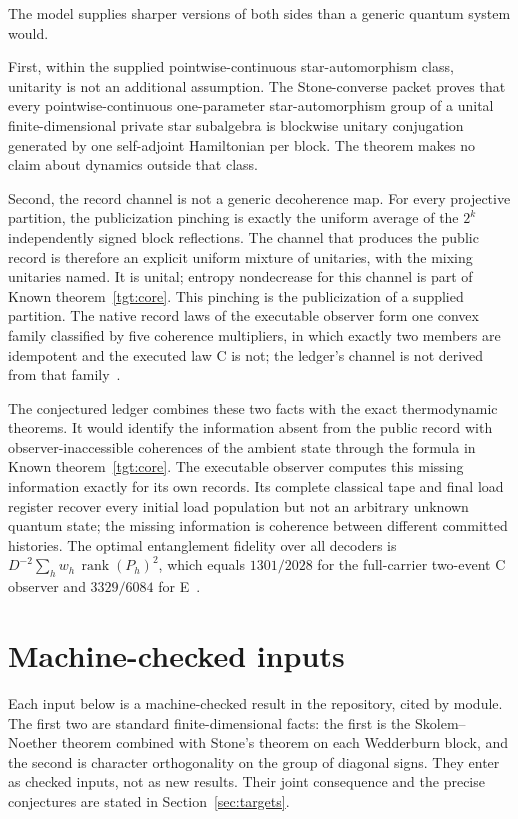 \documentclass[11pt]{article}
\theoremstyle{remark}
\begin{document}
The model supplies sharper versions of both sides than a generic quantum
system would.

First, within the supplied pointwise-continuous star-automorphism class,
unitarity is not an additional assumption. The Stone-converse packet
proves that every pointwise-continuous one-parameter star-automorphism
group of a unital finite-dimensional private star subalgebra is blockwise
unitary conjugation generated by one self-adjoint Hamiltonian per block.
The theorem makes no claim about dynamics outside that class.

Second, the record channel is not a generic decoherence map. For every
projective partition, the publicization pinching is exactly the uniform
average of the $2^{k}$ independently signed block reflections. The
channel that produces the public record is therefore an explicit uniform
mixture of unitaries, with the mixing unitaries named. It is unital; entropy
nondecrease for this channel is part of Known theorem~\ref{tgt:core}. This
pinching is the publicization of a supplied partition. The native record
laws of the executable observer form one convex family classified by five
coherence multipliers, in which exactly two members are idempotent and the
executed law C is not; the ledger's channel is not derived from that
family~\cite{ophrecordlaws}.

The conjectured ledger combines these two facts with the exact thermodynamic
theorems. It would identify the information absent from the public record with
observer-inaccessible coherences of the ambient state through the formula in
Known theorem~\ref{tgt:core}. The executable observer computes this missing
information exactly for its own records. Its complete classical tape and
final load register recover every initial load population but not an
arbitrary unknown quantum state; the missing information is coherence
between different committed histories. The optimal entanglement fidelity
over all decoders is \(D^{-2}\sum_h w_h\,\operatorname{rank}(P_h)^2\), which
equals \(1301/2028\) for the full-carrier two-event C observer and
\(3329/6084\) for E~\cite{ophrecovery}.

\section{Machine-checked inputs}\label{sec:checked-inputs}

Each input below is a machine-checked result in the repository, cited by
module. The first two are standard finite-dimensional facts: the first is
the Skolem--Noether theorem combined with Stone's theorem on each Wedderburn
block, and the second is character orthogonality on the group of diagonal
signs. They enter as checked inputs, not as new results. Their joint consequence and the precise conjectures are stated in
Section~\ref{sec:targets}.
\end{document}
